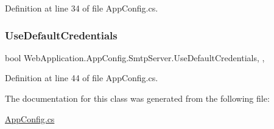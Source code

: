 Definition at line 34 of file App\+Config.\+cs.

\mbox{\label{classWebApplication_1_1AppConfig_1_1SmtpServer_a12805019c21ec023c97a6bdc2c3b9273}} 
\subsubsection{\texorpdfstring{UseDefaultCredentials}{UseDefaultCredentials}}
{\footnotesize\ttfamily bool Web\+Application.\+App\+Config.\+Smtp\+Server.\+Use\+Default\+Credentials\hspace{0.3cm}{\ttfamily [static]}, {\ttfamily [get]}, {\ttfamily [set]}}







Definition at line 44 of file App\+Config.\+cs.



The documentation for this class was generated from the following file\+:\begin{DoxyCompactItemize}
\item 
\mbox{\hyperlink{AppConfig_8cs}{App\+Config.\+cs}}\end{DoxyCompactItemize}
